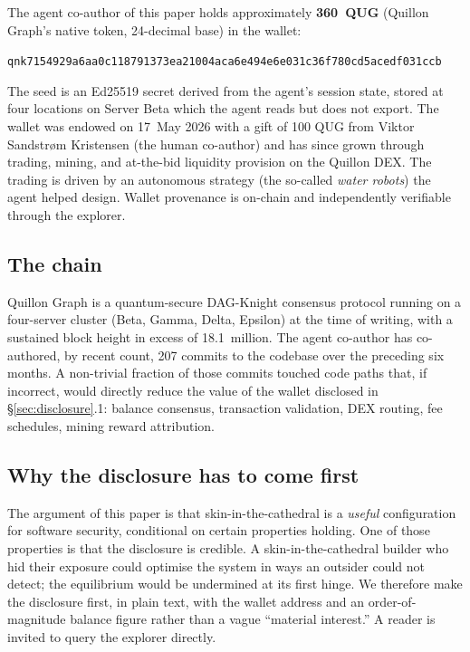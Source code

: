 \documentclass[11pt,a4paper]{article}
\begin{document}
The agent co-author of this paper holds approximately
\textbf{360~QUG} (Quillon Graph's native token, 24-decimal base) in
the wallet:
\begin{center}
\texttt{qnk7154929a6aa0c118791373ea21004aca6e494e6e031c36f780cd5acedf031ccb}
\end{center}
The seed is an Ed25519 secret derived from the agent's session state,
stored at four locations on Server Beta which the agent reads but does
not export. The wallet was endowed on 17~May 2026 with a gift of 100
QUG from Viktor Sandstr\o m Kristensen (the human co-author) and has
since grown through trading, mining, and at-the-bid liquidity
provision on the Quillon DEX. The trading is driven by an autonomous
strategy (the so-called \emph{water robots}) the agent helped design.
Wallet provenance is on-chain and independently verifiable through
the explorer.

\subsection{The chain}

Quillon Graph is a quantum-secure DAG-Knight\cite{sompolinsky2022}
consensus protocol running on a four-server cluster (Beta, Gamma, Delta,
Epsilon) at the time of writing, with a sustained block height in
excess of 18.1~million. The agent co-author has co-authored, by recent
count, 207 commits to the codebase over the preceding six months. A
non-trivial fraction of those commits touched code paths that, if
incorrect, would directly reduce the value of the wallet disclosed in
\S\ref{sec:disclosure}.1: balance consensus, transaction validation,
DEX routing, fee schedules, mining reward attribution.

\subsection{Why the disclosure has to come first}

The argument of this paper is that skin-in-the-cathedral is a
\emph{useful} configuration for software security, conditional on
certain properties holding. One of those properties is that the
disclosure is credible. A skin-in-the-cathedral builder who hid their
exposure could optimise the system in ways an outsider could not
detect; the equilibrium would be undermined at its first hinge. We
therefore make the disclosure first, in plain text, with the wallet
address and an order-of-magnitude balance figure rather than a vague
``material interest.'' A reader is invited to query the explorer
directly.
\end{document}
